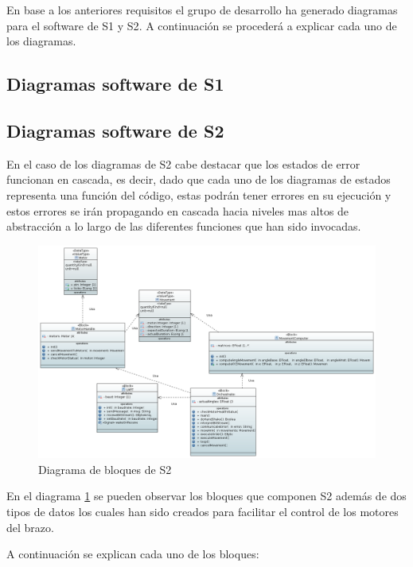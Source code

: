 En base a los anteriores requisitos el grupo de desarrollo ha generado diagramas para el software de \ac{S1} y \ac{S2}. A continuación se procederá a explicar cada uno de los diagramas. 


\subsection{Diagramas software de S1}



\subsection{Diagramas software de S2}

En el caso de los diagramas de \ac{S2} cabe destacar que los estados de error funcionan en cascada, es decir, dado que cada uno de los diagramas de estados representa una función del código, estas podrán tener errores en su ejecución y estos errores se irán propagando en cascada hacia niveles mas altos de abstracción a lo largo de las diferentes funciones que han sido invocadas.

\begin{figure}[H]
    \centering
    \includegraphics[width=\linewidth]{pictures/S2BlockDiagram.PNG}
    \caption{Diagrama de bloques de \ac{S2}}
    \label{fig:diagrama_bloques_s2}
\end{figure}

En el diagrama \ref{fig:diagrama_bloques_s2} se pueden observar los bloques que componen \ac{S2} además de dos tipos de datos los cuales han sido creados para facilitar el control de los motores del brazo.

A continuación se explican cada uno de los bloques:

